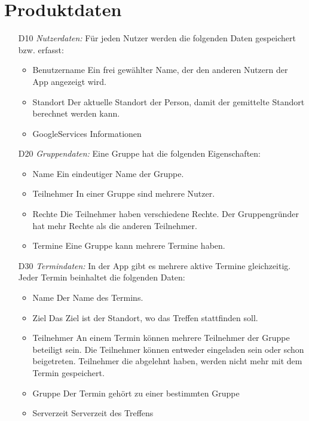 \documentclass{scrartcl}
\begin{document}
	
	\newpage
	
	
	\section{Produktdaten}
	\begin{itemize}
		\item [D10] \textit{Nutzerdaten:}
		Für jeden Nutzer werden die folgenden Daten gespeichert bzw. erfasst:
		\begin{itemize}
			\item Benutzername
			\newline Ein frei gewählter Name, der den anderen Nutzern der App angezeigt wird.
			\item Standort
			\newline Der aktuelle Standort der Person, damit der gemittelte Standort berechnet werden kann.
			\item GoogleServices Informationen
			\newline %
		\end{itemize}
		
		\item [D20] \textit{Gruppendaten:}
		Eine Gruppe hat die folgenden Eigenschaften:
		\begin{itemize}
			\item Name
			\newline Ein eindeutiger Name der Gruppe.
			\item Teilnehmer
			\newline In einer Gruppe sind mehrere Nutzer.
			\item Rechte
			\newline Die Teilnehmer haben verschiedene Rechte. Der Gruppengründer hat mehr Rechte als die anderen Teilnehmer.
			\item Termine
			\newline Eine Gruppe kann mehrere Termine haben.
		\end{itemize}
		
		\item [D30] \textit{Termindaten:}
		In der App gibt es mehrere aktive Termine gleichzeitig. Jeder Termin beinhaltet die folgenden Daten:
		\begin{itemize}
			\item Name
			\newline Der Name des Termins.
			\item Ziel
			\newline Das Ziel ist der Standort, wo das Treffen stattfinden soll.
			\item Teilnehmer
			\newline An einem Termin können mehrere Teilnehmer der Gruppe beteiligt sein. Die Teilnehmer können entweder eingeladen sein oder schon beigetreten. Teilnehmer die abgelehnt haben, werden nicht mehr mit dem Termin gespeichert.
			\item Gruppe
			\newline Der Termin gehört zu einer bestimmten Gruppe
			\item Serverzeit
			\newline Serverzeit des Treffens
		\end{itemize}
	\end{itemize}
	
\end{document}
